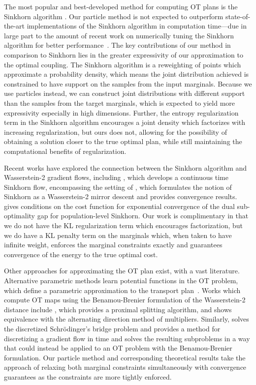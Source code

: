 \documentclass[11pt,a4paper,final]{article}
\newcommand{\1}{\mathbf{1}}
\theoremstyle{plain}
\numberwithin{equation}{section}
\numberwithin{theorem}{section}
\begin{document}
The most popular and best-developed method for computing OT plans is the Sinkhorn algorithm \cite{cuturi_sinkhorn_2013}. Our particle method is not expected to outperform state-of-the-art implementations of the Sinkhorn algorithm in computation time---due in large part to the amount of recent work on numerically tuning the Sinkhorn algorithm for better performance~\cite{altschuler2017near, li2023importance}. The key contributions of our method in comparison to Sinkhorn lies in the greater expressivity of our approximation to the optimal coupling. The Sinkhorn algorithm is a reweighting of points which approximate a probability density, which means the joint distribution achieved is constrained to have support on the samples from the input marginals. Because we use particles instead, we can construct joint distributions with different support than the samples from the target marginals, which is expected to yield more expressivity especially in high dimensions. Further, the entropy regularization term in the Sinkhorn algorithm encourages a joint density which factorizes with increasing regularization, but ours does not, allowing for the possibility of obtaining a solution closer to the true optimal plan, while still maintaining the computational benefits of regularization.

Recent works have explored the connection between the Sinkhorn algorithm and Wasserstein-2 gradient flows, including \cite{karimi_sinkhorn_2024}, which develops a continuous time Sinkhorn flow, encompassing the setting of  \cite{deb_wasserstein_2023}, which formulates the notion of Sinkhorn as a Wasserstein-2 mirror descent and provides convergence results. \cite{chizat_sharper_2024} gives conditions on the cost function for exponential convergence of the dual sub-optimality gap for population-level Sinkhorn. Our work is complimentary in that we do not have the KL regularization term which encourages factorization, but we do have a KL penalty term on the marginals which, when taken to have infinite weight, enforces the marginal constraints exactly and guarantees convergence of the energy to the true optimal cost.



Other approaches for approximating the OT plan exist, with a vast literature. Alternative parametric methods learn potential functions in the OT problem, which define a parametric approximation to the transport plan~\cite{seguy2018large, korotinwasserstein}. Works which compute OT maps using the Benamou-Brenier formulation of the Wasserstein-2 distance include \cite{papadakis_optimal_2014}, which provides a proximal splitting algorithm, and shows equivalence with the alternating direction method of multipliers. Similarly, \cite{li_computations_2018} solves the discretized Schr\"odinger's bridge problem and \cite{carrillo_primal_2022} provides a method for  discretizing a gradient flow in time and solves the resulting subproblems in a way that could instead be applied to an OT problem with  the Benamou-Brenier formulation. Our particle method and corresponding theoretical results take the approach of relaxing both marginal constraints simultaneously with convergence guarantees as the  constraints are more tightly enforced.
\end{document}
